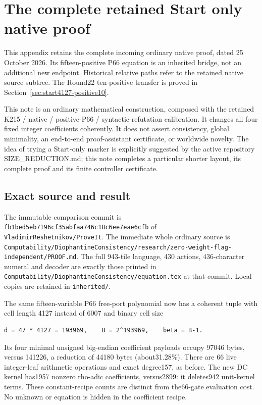 \section{The complete retained Start only native proof}
\label{sec:native-source-proof}
This appendix retains the complete incoming ordinary native proof, dated
25 October 2026. Its fifteen-positive P66 equation is an inherited bridge,
not an additional new endpoint. Historical relative paths refer to the
retained native source subtree. The Round22 ten-positive transfer is proved
in Section~\ref{sec:start4127-positive10}.

This note is an ordinary mathematical construction, composed with the retained K215 / native / positive-P66 / syntactic-refutation calibration. It changes all four fixed integer coefficients coherently. It does not assert consistency, global minimality, an end-to-end proof-assistant certificate, or worldwide novelty. The idea of trying a Start-only marker is explicitly suggested by the active repository SIZE\_REDUCTION.md; this note completes a particular shorter layout, its complete proof and its finite controller certificate.

\subsection{Exact source and result}
The immutable comparison commit is \nolinkurl{fb1bed5eb7196cf35abfaa746c18c6ee7eae6cfb} of \nolinkurl{VladimirReshetnikov/ProveIt}. The immediate whole ordinary source is \nolinkurl{Computability/DiophantineConsistency/research/zero-weight-flag-independent/PROOF.md}. The full 943-tile language, 430 actions, 436-character numeral and decoder are exactly those printed in \nolinkurl{Computability/DiophantineConsistency/equation.tex} at that commit. Local copies are retained in \nolinkurl{inherited/}.

The same fifteen-variable P66 free-port polynomial now has a coherent tuple with cell length 4127 instead of 6007 and binary cell size

\begin{Verbatim}[fontsize=\small,breaklines=true,breakanywhere=true,breaksymbolleft={}]
d = 47 * 4127 = 193969,    B = 2^193969,    beta = B-1.
\end{Verbatim}

Its four minimal unsigned big-endian coefficient payloads occupy 97046 bytes, versus 141226, a reduction of 44180 bytes (about31.28\%). There are 66 live integer-leaf arithmetic operations and exact degree157, as before. The new DC kernel has1957 nonzero rho-adic coefficients, versus2899: it deletes942 unit-kernel terms. These constant-recipe counts are distinct from the66-gate evaluation cost. No unknown or equation is hidden in the coefficient recipe.

